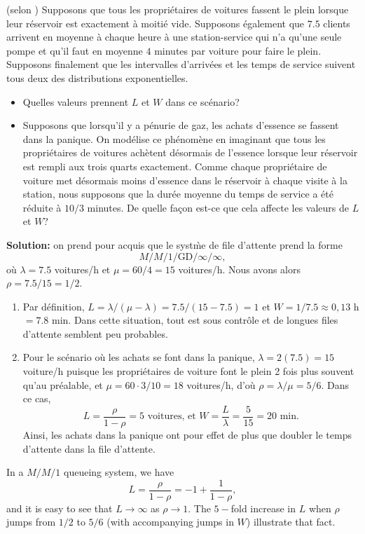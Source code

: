 \begin{Exemple} (selon \cite{QS_E}) Supposons que tous les propriétaires de voitures fassent le plein lorsque leur réservoir est exactement à moitié vide. Supposons \'egalement que $7.5$ clients arrivent en moyenne \`a chaque heure à une station-service qui n'a qu'une seule pompe et qu'il faut en moyenne $4$ minutes par voiture pour faire le plein. Supposons finalement que les intervalles d'arriv\'ees et les temps de service suivent tous deux des distributions exponentielles. \begin{itemize}[noitemsep]
	\item[(a)] Quelles valeurs prennent $L$ et $W$ dans ce sc\'enario? 
	\item[(b)] Supposons que lorsqu'il y a pénurie de gaz, les achats d'essence se fassent dans la panique. On modélise ce phénomène en imaginant que tous les propriétaires de voitures achètent désormais de l'essence lorsque leur réservoir est rempli aux trois quarts exactement. Comme chaque propriétaire de voiture met désormais moins d'essence dans le réservoir à chaque visite à la station, nous supposons que la durée moyenne du temps de service  a été réduite à $10/3$ minutes. De quelle fa\c{c}on est-ce que cela affecte les valeurs de $L$ et $W$?
\end{itemize}
\textbf{Solution:} on prend pour acquis que le syst\`me de file d'attente prend la forme $$M/M/1/\textrm{GD}/\infty/\infty,$$ o\`u $\lambda = 7.5$ voitures/h et $\mu = 60/4 = 15$ voitures/h.  Nous avons alors $\rho = 7.5/15 = 1/2$.
\begin{enumerate}[noitemsep]
	\item[(a)] Par définition, $L = \lambda/(\mu - \lambda) = 7.5/(15-7.5) = 1$ et $W = 1/7.5 \approx 0,13$ h $=7.8$ min. Dans cette situation, tout est sous contrôle et de longues files d'attente semblent peu probables.
\item[(b)] Pour le sc\'enario o\`u les achats se font dans la panique,   $\lambda = 2(7.5)=15$ voiture/h puisque les propri\'etaires de voiture font le plein 2 fois plus souvent qu'au pr\'ealable, et $\mu = 60 \cdot 3 /10  = 18$ voitures/h, d'o\`u $\rho = \lambda/\mu = 5/6$. Dans ce cas,   
$$ L = \frac{\rho}{1-\rho} = 5 \text{ voitures, et } W = \frac{L}{\lambda} = \frac{5}{15} = 20 \text{ min}.$$
Ainsi, les achats dans la panique ont pour effet de plus que doubler le temps d'attente dans la file d'attente.
\end{enumerate}
\end{Exemple}
\noindent In a $M/M/1$ queueing system, we have $$L=\frac{\rho}{1-\rho}=-1+\frac{1}{1-\rho}, $$ and it is easy to see that $L\to\infty$ as $\rho\to 1$. The $5-$fold increase in $L$ when $\rho$ jumps from $1/2$ to $5/6$ (with accompanying jumps in $W$) illustrate that fact. 
